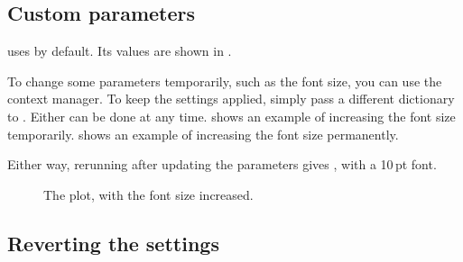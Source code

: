 \documentclass[10pt]{article}
\newcommand\latexify{\LaTeX ify}
\begin{document}
\subsection{Custom parameters}
 uses  by default.
Its values are shown in .

\begin{listing}[H]
  \caption[Default \latexify\ settings]{The default parameters changed by \latexify.}
  \label{lst:default_params}
\end{listing}

To change some parameters temporarily, such as the font size, you can use the  context manager. To keep the settings applied, simply pass a different dictionary to .
Either can be done at any time.
 shows an example of increasing the font size temporarily.
 shows an example of increasing the font size permanently.

\begin{listing}[H]
  \caption[Using custom \latexify\ settings]{Increasing the font size is as simple as setting it once.}
  \label{lst:new_params_temp}
\end{listing}

\begin{listing}[H]
  \caption[Permanently changing \latexify\ settings]{Pass a dictionary to  to permanently change a setting.}
  \label{lst:new_params_permanent}
\end{listing}

Either way, rerunning  after updating the parameters gives , with a 10\,pt font.

\begin{figure}[H]
  \centering
  
  \caption[Custom \LaTeX\ plot]{The plot, with the font size increased.}
  \label{fig:sincos_big_font_temp}
\end{figure}

\subsection{Reverting the settings}
\end{document}
